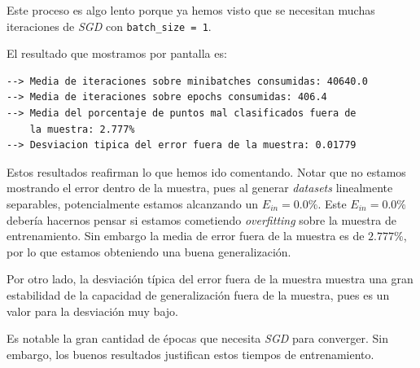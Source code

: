 \documentclass[11pt]{article}
\begin{document}
Este proceso es algo lento porque ya hemos visto que se necesitan muchas iteraciones de \emph{SGD} con \lstinline{batch_size = 1}.

El resultado que mostramos por pantalla es:

\begin{lstlisting}[caption={Resultado de las 100 iteraciones del experimento}, captionpos=b]
--> Media de iteraciones sobre minibatches consumidas: 40640.0
--> Media de iteraciones sobre epochs consumidas: 406.4
--> Media del porcentaje de puntos mal clasificados fuera de
    la muestra: 2.777%
--> Desviacion tipica del error fuera de la muestra: 0.01779
\end{lstlisting}

Estos resultados reafirman lo que hemos ido comentando. Notar que no estamos mostrando el error dentro de la muestra, pues al generar \emph{datasets} linealmente separables, potencialmente estamos alcanzando un $E_{in} = 0.0\%$. Este $E_{in} = 0.0\%$ debería hacernos pensar si estamos cometiendo \emph{overfitting} sobre la muestra de entrenamiento. Sin embargo la media de error fuera de la muestra es de $2.777\%$, por lo que estamos obteniendo una buena generalización.

Por otro lado, la desviación típica del error fuera de la muestra muestra una gran estabilidad de la capacidad de generalización fuera de la muestra, pues es un valor para la desviación muy bajo.

Es notable la gran cantidad de épocas que necesita \emph{SGD} para converger. Sin embargo, los buenos resultados justifican estos tiempos de entrenamiento.







\pagebreak




\end{document}
